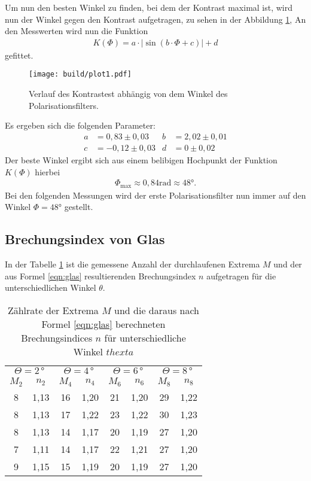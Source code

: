 Um nun den besten Winkel zu finden, bei dem der Kontrast maximal ist, wird
nun der Winkel gegen den Kontrast aufgetragen, zu sehen in der Abbildung \ref{fig:kontrast},
An den Messwerten wird nun die Funktion
\begin{align}
  K\left(\Phi\right) = a \cdot \left| \sin\left(b\cdot\Phi+c \right)\right| + d
\end{align}
gefittet.

\begin{figure}
    \centering
    \texttt{[image: build/plot1.pdf]}
    \caption{Verlauf des Kontrastest abhängig von dem Winkel des Polarisationsfilters.}
    \label{fig:kontrast}
\end{figure}

Es ergeben sich die folgenden Parameter:
\begin{align*}
  a&=0,83\pm0,03
  &b&=2,02\pm0,01\\
  c&=-0,12\pm0,03
  &d&=0\pm0,02
\end{align*}
Der beste Winkel ergibt sich aus einem belibigen
Hochpunkt der Funktion $K(\Phi)$ hierbei
\begin{align*}
 \Phi_\mathrm{max}\approx0,84\si{\radian}\approx48\si{\degree}.
\end{align*}
Bei den folgenden Messungen wird der erste Polarisationsfilter
nun immer auf den Winkel $\Phi=48\si{\degree}$ gestellt.


\subsection{Brechungsindex von Glas}
In der Tabelle \ref{tab:glas} ist die gemessene Anzahl der durchlaufenen Extrema $M$
und der aus Formel \eqref{eqn:glas} resultierenden Brechungsindex $n$ aufgetragen
für die unterschiedlichen Winkel $\theta$.

\begin{table}
  \caption{Zählrate der Extrema $M$ und die daraus nach Formel \eqref{eqn:glas} berechneten Brechungsindices $n$ für unterschiedliche Winkel $thexta$}
  \label{tab:glas}
  \begin{tabular}{c c | c c | c c | c c}
    \toprule
\multicolumn{2}{c}{$\Theta=2\,\si{\degree}$}  &  \multicolumn{2}{c}{$\Theta=4\,\si{\degree}$} & \multicolumn{2}{c}{$\Theta=6\,\si{\degree}$} & \multicolumn{2}{c}{$\Theta=8\,\si{\degree}$}\\
      $M_2$ &  $n_2$ &  $M_4$ & $n_4$ & $M_6$ &  $n_6$ & $M_8$ & $n_8$ \\
  \midrule
       8 &  1,13 &  16 &  1,20 & 21 & 1,20 & 29 & 1,22\\
       8 &  1,13 &  17 &  1,22 & 23 & 1,22 & 30 & 1,23\\
       8 &  1,13 &  14 &  1,17 & 20 & 1,19 & 27 & 1,20\\
       7 &  1,11 &  14 &  1,17 & 22 & 1,21 & 27 & 1,20\\
       9 &  1,15 &  15 &  1,19 & 20 & 1,19 & 27 & 1,20\\
  \bottomrule
  \end{tabular}
\end{table}

